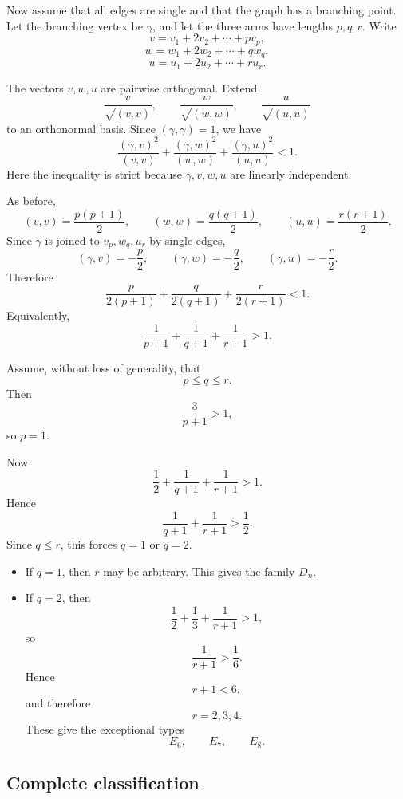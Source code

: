 Now assume that all edges are single and that the graph has a branching
point. Let the branching vertex be \(\gamma\), and let the three arms have
lengths \(p,q,r\). Write
\[
    v=v_1+2v_2+\cdots+p v_p,
\]
\[
    w=w_1+2w_2+\cdots+q w_q,
\]
\[
    u=u_1+2u_2+\cdots+r u_r.
\]

The vectors \(v,w,u\) are pairwise orthogonal. Extend
\[
    \frac{v}{\sqrt{(v,v)}},
    \qquad
    \frac{w}{\sqrt{(w,w)}},
    \qquad
    \frac{u}{\sqrt{(u,u)}}
\]
to an orthonormal basis. Since \((\gamma,\gamma)=1\), we have
\[
    \frac{(\gamma,v)^2}{(v,v)}
    +
    \frac{(\gamma,w)^2}{(w,w)}
    +
    \frac{(\gamma,u)^2}{(u,u)}
    < 1.
\]
Here the inequality is strict because \(\gamma,v,w,u\) are linearly
independent.

As before,
\[
    (v,v)=\frac{p(p+1)}{2},
    \qquad
    (w,w)=\frac{q(q+1)}{2},
    \qquad
    (u,u)=\frac{r(r+1)}{2}.
\]
Since \(\gamma\) is joined to \(v_p,w_q,u_r\) by single edges,
\[
    (\gamma,v)=-\frac{p}{2},
    \qquad
    (\gamma,w)=-\frac{q}{2},
    \qquad
    (\gamma,u)=-\frac{r}{2}.
\]
Therefore
\[
    \frac{p}{2(p+1)}
    +
    \frac{q}{2(q+1)}
    +
    \frac{r}{2(r+1)}
    <1.
\]
Equivalently,
\[
    \frac{1}{p+1}
    +
    \frac{1}{q+1}
    +
    \frac{1}{r+1}
    >1.
\]

Assume, without loss of generality, that
\[
    p\le q\le r.
\]
Then
\[
    \frac{3}{p+1}>1,
\]
so \(p=1\).

Now
\[
    \frac12+\frac{1}{q+1}+\frac{1}{r+1}>1.
\]
Hence
\[
    \frac{1}{q+1}+\frac{1}{r+1}>\frac12.
\]
Since \(q\le r\), this forces \(q=1\) or \(q=2\).

\begin{itemize}
    \item If \(q=1\), then \(r\) may be arbitrary. This gives the family
          \(D_n\).

    \item If \(q=2\), then
          \[
              \frac12+\frac13+\frac{1}{r+1}>1,
          \]
          so
          \[
              \frac{1}{r+1}>\frac16.
          \]
          Hence
          \[
              r+1<6,
          \]
          and therefore
          \[
              r=2,3,4.
          \]
          These give the exceptional types
          \[
              E_6,\qquad E_7,\qquad E_8.
          \]
\end{itemize}

\subsection{Complete classification}

